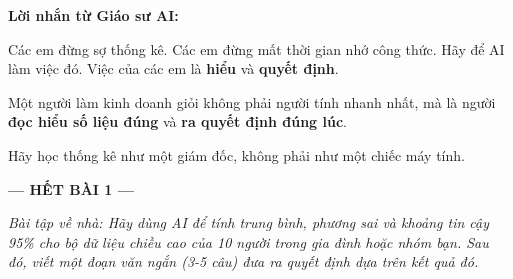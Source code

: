 \documentclass[a4paper,12pt]{article}
\theoremstyle{remark}
\begin{document}
\begin{center}
\end{center}

\begin{aibox}
\textbf{Lời nhắn từ Giáo sư AI:}

Các em đừng sợ thống kê. Các em đừng mất thời gian nhớ công thức. Hãy để AI làm việc đó. Việc của các em là \textbf{hiểu} và \textbf{quyết định}. 

Một người làm kinh doanh giỏi không phải người tính nhanh nhất, mà là người \textbf{đọc hiểu số liệu đúng} và \textbf{ra quyết định đúng lúc}. 

Hãy học thống kê như một giám đốc, không phải như một chiếc máy tính.
\end{aibox}

\begin{center}
    {\large\color{maincolor}\textbf{--- HẾT BÀI 1 ---}}
\end{center}

\begin{center}
    \textit{Bài tập về nhà: Hãy dùng AI để tính trung bình, phương sai và khoảng tin cậy 95\% cho bộ dữ liệu chiều cao của 10 người trong gia đình hoặc nhóm bạn. Sau đó, viết một đoạn văn ngắn (3-5 câu) đưa ra quyết định dựa trên kết quả đó.}
\end{center}

\vspace{1cm}
\end{document}
